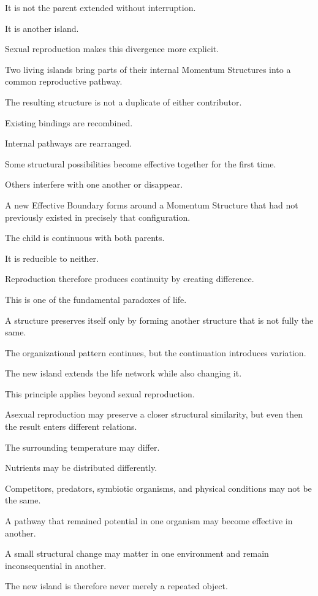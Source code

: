It is not the parent extended without interruption.

It is another island.

Sexual reproduction makes this divergence more explicit.

Two living islands bring parts of their internal Momentum Structures into a common reproductive pathway.

The resulting structure is not a duplicate of either contributor.

Existing bindings are recombined.

Internal pathways are rearranged.

Some structural possibilities become effective together for the first time.

Others interfere with one another or disappear.

A new Effective Boundary forms around a Momentum Structure that had not previously existed in precisely that configuration.

The child is continuous with both parents.

It is reducible to neither.

Reproduction therefore produces continuity by creating difference.

This is one of the fundamental paradoxes of life.

A structure preserves itself only by forming another structure that is not fully the same.

The organizational pattern continues, but the continuation introduces variation.

The new island extends the life network while also changing it.

This principle applies beyond sexual reproduction.

Asexual reproduction may preserve a closer structural similarity, but even then the result enters different relations.

The surrounding temperature may differ.

Nutrients may be distributed differently.

Competitors, predators, symbiotic organisms, and physical conditions may not be the same.

A pathway that remained potential in one organism may become effective in another.

A small structural change may matter in one environment and remain inconsequential in another.

The new island is therefore never merely a repeated object.

